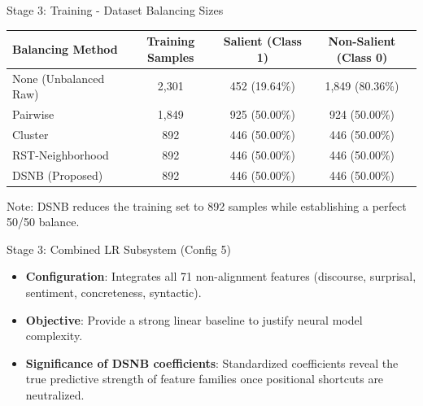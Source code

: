 \documentclass[aspectratio=169]{beamer}
\begin{document}
\begin{frame}{Stage 3: Training - Dataset Balancing Sizes}
    \begin{table}
        \centering
        \small
        \begin{tabular}{lccc}
            \toprule
            \textbf{Balancing Method} & \textbf{Training Samples} & \textbf{Salient (Class 1)} & \textbf{Non-Salient (Class 0)} \\
            \midrule
            None (Unbalanced Raw) & 2,301 & 452 (19.64\%) & 1,849 (80.36\%) \\
            Pairwise & 1,849 & 925 (50.00\%) & 924 (50.00\%) \\
            Cluster & 892 & 446 (50.00\%) & 446 (50.00\%) \\
            RST-Neighborhood & 892 & 446 (50.00\%) & 446 (50.00\%) \\
            DSNB (Proposed) & 892 & 446 (50.00\%) & 446 (50.00\%) \\
            \bottomrule
        \end{tabular}
    \end{table}
    \vspace{0.4cm}
    \centering
    Note: DSNB reduces the training set to 892 samples while establishing a perfect 50/50 balance.
\end{frame}

\begin{frame}{Stage 3: Combined LR Subsystem (Config 5)}
    \begin{itemize}
        \item \textbf{Configuration}: Integrates all 71 non-alignment features (discourse, surprisal, sentiment, concreteness, syntactic).
        \vspace{0.2cm}
        \item \textbf{Objective}: Provide a strong linear baseline to justify neural model complexity.
        \vspace{0.2cm}
        \item \textbf{Significance of DSNB coefficients}: Standardized coefficients reveal the true predictive strength of feature families once positional shortcuts are neutralized.
    \end{itemize}
\end{frame}
\end{document}
